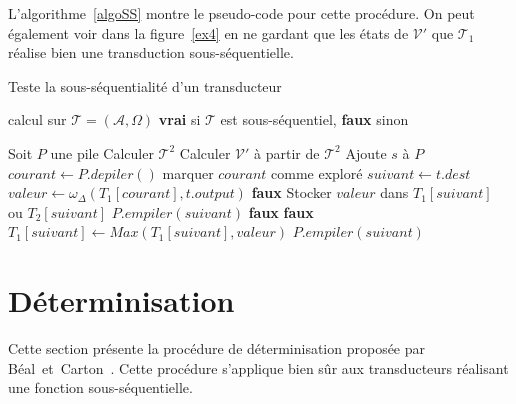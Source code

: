 		L'algorithme~\ref{algoSS} montre le pseudo-code pour cette procédure. On peut également voir dans la figure~\ref{ex4} en ne gardant que les états de $\mathscr{V'}$ que $\mathscr{T}_1$ réalise bien une transduction sous-séquentielle.
		
		\begin{algorithm}
			\caption{Teste la sous-séquentialité d'un transducteur}
			\label{algoSS}
			\begin{algorithmic}[1]
				\Require calcul sur $\mathscr{T} = (\mathscr{A},\Omega)$
				\Ensure \textbf{vrai} si $\mathscr{T}$ est sous-séquentiel, \textbf{faux} sinon
				
				\Statex
				\State Soit $P$ une pile
				\State Calculer $\mathscr{T^2}$
				\State Calculer $\mathscr{V'}$ à partir de $\mathscr{T^2}$
						\State Ajoute $s$ à $P$
					\EndIf
				\EndFor
				\Statex
					\State $courant \gets P.depiler()$
					\State marquer $courant$ comme exploré
						\State $suivant \gets t.dest$
							\State $valeur \gets \omega_\Delta(T_1[courant], t.output)$
								\State \Return \textbf{faux}
								\State Stocker $valeur$ dans $T_1[suivant]$ ou $T_2[suivant]$
								\State $P.empiler(suivant)$
									\State \Return \textbf{faux}
								\EndIf
									\State \Return \textbf{faux}
								\EndIf
								\State $T_1[suivant] \gets Max(T_1[suivant], valeur)$
									\State $P.empiler(suivant)$
								\EndIf
							\EndIf
						\EndIf
					\EndFor	
				\EndWhile
			\end{algorithmic}
		\end{algorithm}
		
\section{Déterminisation}
\label{determinize}

	Cette section présente la procédure de déterminisation proposée par Béal~et~Carton~\cite{Bea02}. Cette procédure s'applique bien sûr aux transducteurs réalisant une fonction sous-séquentielle.
	
